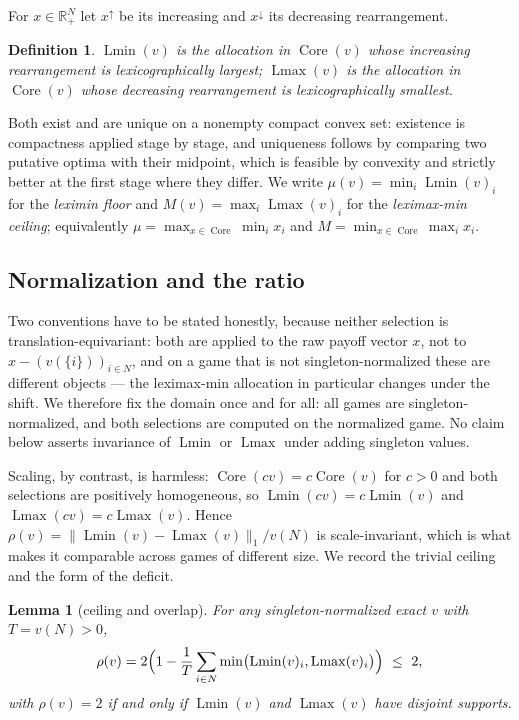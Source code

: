 \documentclass[11pt]{article}
\newtheorem{lemma}[theorem]{Lemma}
\newtheorem{definition}[theorem]{Definition}
\newcommand{\core}{\operatorname{Core}}
\newcommand{\Lmin}{\operatorname{Lmin}}
\newcommand{\Lmax}{\operatorname{Lmax}}
\begin{document}
For $x\in\mathbb R^N_+$ let $x^\uparrow$ be its increasing and
$x^\downarrow$ its decreasing rearrangement.

\begin{definition}
$\Lmin(v)$ is the allocation in $\core(v)$ whose increasing rearrangement is
lexicographically largest; $\Lmax(v)$ is the allocation in $\core(v)$ whose
decreasing rearrangement is lexicographically smallest.
\end{definition}

Both exist and are unique on a nonempty compact convex set: existence is
compactness applied stage by stage, and uniqueness follows by comparing two
putative optima with their midpoint, which is feasible by convexity and
strictly better at the first stage where they differ.  We write
$\mu(v)=\min_i\Lmin(v)_i$ for the \emph{leximin floor} and
$M(v)=\max_i\Lmax(v)_i$ for the \emph{leximax-min ceiling}; equivalently
$\mu=\max_{x\in\core}\min_i x_i$ and $M=\min_{x\in\core}\max_i x_i$.

\subsection{Normalization and the ratio}

Two conventions have to be stated honestly, because neither selection is
translation-equivariant: both are applied to the raw payoff vector $x$, not
to $x-(v(\{i\}))_{i\in N}$, and on a game that is not singleton-normalized
these are different objects --- the leximax-min allocation in particular
changes under the shift.  We therefore fix the domain once and for all: all
games are singleton-normalized, and both selections are computed on the
normalized game.  No claim below asserts invariance of $\Lmin$ or $\Lmax$
under adding singleton values.

Scaling, by contrast, is harmless: $\core(cv)=c\core(v)$ for $c>0$ and both
selections are positively homogeneous, so $\Lmin(cv)=c\Lmin(v)$ and
$\Lmax(cv)=c\Lmax(v)$.  Hence $\rho(v)=\|\Lmin(v)-\Lmax(v)\|_1/v(N)$ is
scale-invariant, which is what makes it comparable across games of different
size.  We record the trivial ceiling and the form of the deficit.

\begin{lemma}[ceiling and overlap]\label{lem:ceiling}
For any singleton-normalized exact $v$ with $T=v(N)>0$,
\[
 \rho(v)=2\Bigl(1-\frac1T\sum_{i\in N}\min\bigl(\Lmin(v)_i,\Lmax(v)_i\bigr)\Bigr)
 \ \le\ 2,
\]
with $\rho(v)=2$ if and only if $\Lmin(v)$ and $\Lmax(v)$ have disjoint
supports.
\end{lemma}
\end{document}
